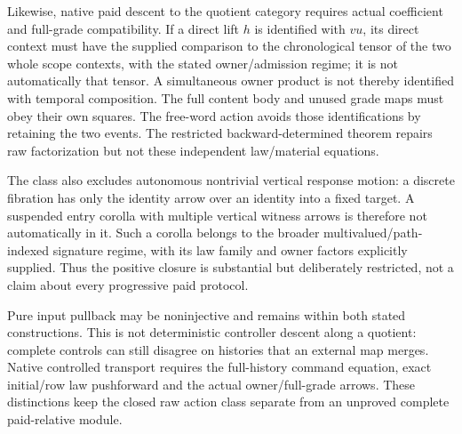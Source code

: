 \documentclass[11pt]{article}
\begin{document}
Likewise, native paid descent to the quotient category requires actual coefficient and full-grade compatibility. If a direct lift $h$ is identified with $vu$, its direct context must have the supplied comparison to the chronological tensor of the two whole scope contexts, with the stated owner/admission regime; it is not automatically that tensor. A simultaneous owner product is not thereby identified with temporal composition. The full content body and unused grade maps must obey their own squares. The free-word action avoids those identifications by retaining the two events. The restricted backward-determined theorem repairs raw factorization but not these independent law/material equations.

The class also excludes autonomous nontrivial vertical response motion: a discrete fibration has only the identity arrow over an identity into a fixed target. A suspended entry corolla with multiple vertical witness arrows is therefore not automatically in it. Such a corolla belongs to the broader multivalued/path-indexed signature regime, with its law family and owner factors explicitly supplied. Thus the positive closure is substantial but deliberately restricted, not a claim about every progressive paid protocol.

Pure input pullback may be noninjective and remains within both stated constructions. This is not deterministic controller descent along a quotient: complete controls can still disagree on histories that an external map merges. Native controlled transport requires the full-history command equation, exact initial/row law pushforward and the actual owner/full-grade arrows. These distinctions keep the closed raw action class separate from an unproved complete paid-relative module.
\end{document}
